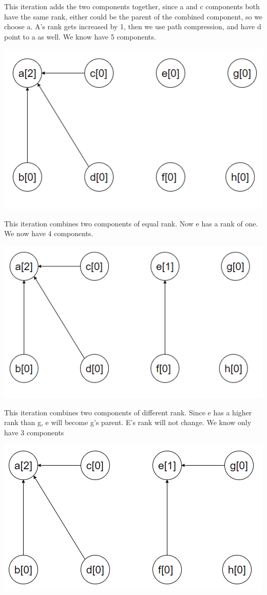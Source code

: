 \documentclass[10pt,a4paper]{article}
\begin{document}
This iteration adds the two components together, since a and c components both have the same rank, either could be the parent of the combined component, so we choose a. A's rank gets increased by 1, then we use path compression, and have d point to a as well. We know have 5 components.

	\includegraphics[scale = .5]{boi4.PNG}

This iteration combines two components of equal rank. Now e has a rank of one. We now have 4 components. 

	\includegraphics[scale = .5]{boi5.PNG}
	
This iteration combines two components of different rank. Since e has a higher rank than g, e will become g's parent. E's rank will not change. We know only have 3 components 

	\includegraphics[scale = .5]{boi6.PNG}
\end{document}
